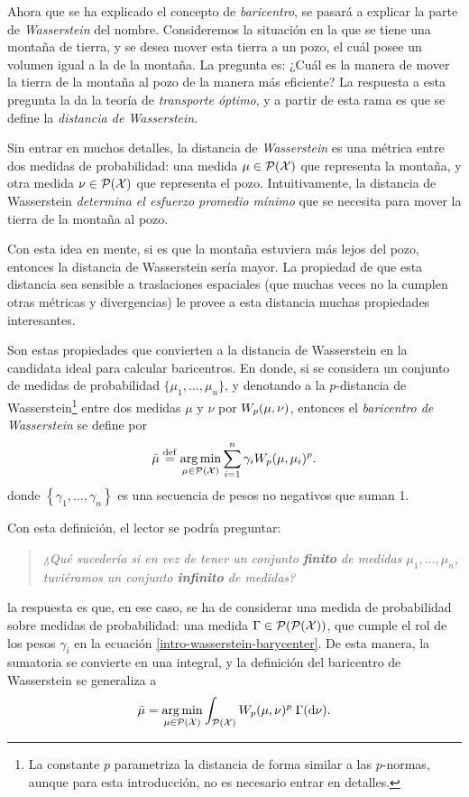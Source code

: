 Ahora que se ha explicado el concepto de \emph{baricentro}, se pasará a explicar la parte de \emph{Wasserstein} del nombre. Consideremos la situación en la que se tiene una montaña de tierra, y se desea mover esta tierra a un pozo, el cuál posee un volumen igual a la de la montaña. La pregunta es: ¿Cuál es la manera de mover la tierra de la montaña al pozo de la manera más eficiente? La respuesta a esta pregunta la da la teoría de \emph{transporte óptimo}, y a partir de esta rama es que se define la \emph{distancia de Wasserstein}.

Sin entrar en muchos detalles, la distancia de \emph{Wasserstein} es una métrica entre dos medidas de probabilidad: una medida $\mu\in \ProbSpace[\cX]$ que representa la montaña, y otra medida $\nu\in \ProbSpace[\cX]$ que representa el pozo. Intuitivamente, la distancia de Wasserstein \emph{determina el esfuerzo promedio mínimo} que se necesita para mover la tierra de la montaña al pozo.

Con esta idea en mente, si es que la montaña estuviera más lejos del pozo, entonces la distancia de Wasserstein sería mayor. La propiedad de que esta distancia sea sensible a traslaciones espaciales (que muchas veces no la cumplen otras métricas y divergencias) le provee a esta distancia muchas propiedades interesantes.

Son estas propiedades que convierten a la distancia de Wasserstein en la candidata ideal para calcular baricentros. En donde, si se considera un conjunto de medidas de probabilidad $\{\mu_1, \ldots, \mu_n\}$, y denotando a la $p$-distancia de Wasserstein\footnote{La constante $p$ parametriza la distancia de forma similar a las $p$-normas, aunque para esta introducción, no es necesario entrar en detalles.} entre dos medidas $\mu$ y $\nu$ por $\Wasserstein[p]{\mu}{\nu}$, entonces el \emph{baricentro de Wasserstein} se define por
\begin{equation}\label{intro-wasserstein-barycenter}
    \bar\mu \eqdef \argmin_{\mu \in \ProbSpace[\cX]} \sum_{i=1}^n \gamma_i \Wasserstein[p]{\mu}{\mu_i}^p.
\end{equation}
donde $\left\{ \gamma_1, \ldots, \gamma_n \right\}$ es una secuencia de pesos no negativos que suman 1.

Con esta definición, el lector se podría preguntar:
\begin{quotation}
    \textit{¿Qué sucedería si en vez de tener un conjunto \textbf{finito} de medidas $\mu_1, \ldots, \mu_n$, tuviéramos un conjunto \textbf{infinito} de medidas?}
\end{quotation}
la respuesta es que, en ese caso, se ha de considerar una medida de probabilidad sobre medidas de probabilidad: una medida $\Gamma \in \ProbSpace[\ProbSpace[\cX]]$, que cumple el rol de los pesos $\gamma_i$ en la ecuación \eqref{intro-wasserstein-barycenter}. De esta manera, la sumatoria se convierte en una integral, y la definición del baricentro de Wasserstein se generaliza a
\begin{equation}
    \bar\mu = \argmin_{\mu \in \ProbSpace[\cX]} \int_{\ProbSpace[\cX]} \Wasserstein[p]{\mu}{\nu}^p \; {\Gamma(\dd \nu)}.
\end{equation}

